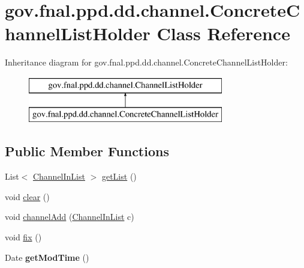 \hypertarget{classgov_1_1fnal_1_1ppd_1_1dd_1_1channel_1_1ConcreteChannelListHolder}{\section{gov.\-fnal.\-ppd.\-dd.\-channel.\-Concrete\-Channel\-List\-Holder Class Reference}
\label{classgov_1_1fnal_1_1ppd_1_1dd_1_1channel_1_1ConcreteChannelListHolder}
}
Inheritance diagram for gov.\-fnal.\-ppd.\-dd.\-channel.\-Concrete\-Channel\-List\-Holder\-:\begin{figure}[H]
\begin{center}
\leavevmode
\includegraphics[height=2.000000cm]{classgov_1_1fnal_1_1ppd_1_1dd_1_1channel_1_1ConcreteChannelListHolder}
\end{center}
\end{figure}
\subsection*{Public Member Functions}
\begin{DoxyCompactItemize}
\item 
List$<$ \hyperlink{classgov_1_1fnal_1_1ppd_1_1dd_1_1channel_1_1ChannelInList}{Channel\-In\-List} $>$ \hyperlink{classgov_1_1fnal_1_1ppd_1_1dd_1_1channel_1_1ConcreteChannelListHolder_affa1b398ed9fc7dbad18215765653e14}{get\-List} ()
\item 
void \hyperlink{classgov_1_1fnal_1_1ppd_1_1dd_1_1channel_1_1ConcreteChannelListHolder_aef1741e4b499729c50dce421c87938b8}{clear} ()
\item 
void \hyperlink{classgov_1_1fnal_1_1ppd_1_1dd_1_1channel_1_1ConcreteChannelListHolder_ad56aa51994e24f71e2ae6879de6d0bb7}{channel\-Add} (\hyperlink{classgov_1_1fnal_1_1ppd_1_1dd_1_1channel_1_1ChannelInList}{Channel\-In\-List} c)
\item 
void \hyperlink{classgov_1_1fnal_1_1ppd_1_1dd_1_1channel_1_1ConcreteChannelListHolder_aa560e7478cd1776380d9ff8e131c65c7}{fix} ()
\item 
\hypertarget{classgov_1_1fnal_1_1ppd_1_1dd_1_1channel_1_1ConcreteChannelListHolder_a2495c874dcc8254b8b6c9e15e981d4c0}{Date {\bfseries get\-Mod\-Time} ()}\label{classgov_1_1fnal_1_1ppd_1_1dd_1_1channel_1_1ConcreteChannelListHolder_a2495c874dcc8254b8b6c9e15e981d4c0}

\end{DoxyCompactItemize}


